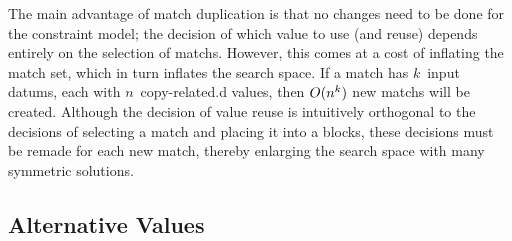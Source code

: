 The main advantage of \gls{match duplication} is that no changes need to be done
for the \gls{constraint model}; the decision of which value to use (and reuse)
depends entirely on the selection of \glspl{match}.
%
However, this comes at a cost of inflating the \gls{match set}, which in turn
inflates the \gls{search space}.
%
If a \gls{match} has $k$~\glspl{input datum}, each with $n$~\gls{copy-related.d}
values, then $O(n^k)$ new \glspl{match} will be created.
%
Although the decision of \gls{value reuse} is intuitively orthogonal to the
decisions of selecting a \gls{match} and placing it into a \glspl{block}, these
decisions must be remade for each new \gls{match}, thereby enlarging the
\gls{search space} with many symmetric \glspl{solution}.


\subsection{Alternative Values}

